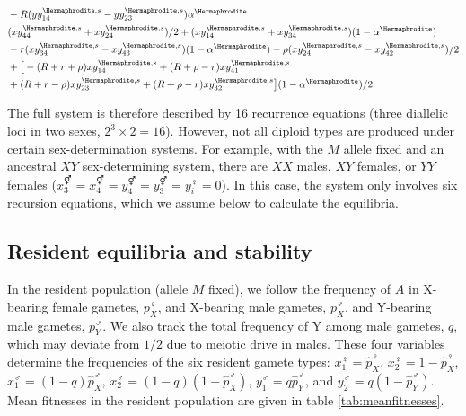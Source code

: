 \documentclass[12pt]{article}
\begin{document}
\begin{subequations}
\begin{align}
\begin{split}
&-R(yy_{14}^{\Hermaphrodite,s}-yy_{23}^{\Hermaphrodite,s}) \alpha^\Hermaphrodite\\
&(xy_{44}^{\Hermaphrodite,s}+xy_{24}^{\Hermaphrodite,s})/2+(xy_{14}^{\Hermaphrodite,s}+xy_{34}^{\Hermaphrodite,s})(1-\alpha^\Hermaphrodite)\\
&- r(xy_{34}^{\Hermaphrodite,s}-xy_{43}^{\Hermaphrodite,s})(1-\alpha^\Hermaphrodite) - \rho(xy_{24}^{\Hermaphrodite,s}-xy_{42}^{\Hermaphrodite,s})/2\\
&+\big{[}-(R+r+\rho) xy_{14}^{\Hermaphrodite,s} + (R+\rho-r)xy_{41}^{\Hermaphrodite,s}\\
&+(R+r-\rho) xy_{23}^{\Hermaphrodite,s} + (R+\rho-r) xy_{32}^{\Hermaphrodite,s}\big{]}(1-\alpha^\Hermaphrodite)/2
\end{split}
\end{align}
\label{eq:recursions}
\end{subequations}

\endgroup

\noindent
The full system is therefore described by 16 recurrence equations (three diallelic loci in two sexes, $2^3 \times 2 = 16$). 
However, not all diploid types are produced under certain sex-determination systems. 
For example, with the $M$ allele fixed and an ancestral $XY$ sex-determining system, there are $XX$ males, $XY$ females, or $YY$ females ($x_{3}^\Hermaphrodite=x_{4}^\Hermaphrodite=y_{4}^\Hermaphrodite=y_{3}^\Hermaphrodite=y_{i}^\female=0$). 
In this case, the system only involves six recursion equations, %
which we assume below to calculate the equilibria. 


\subsection*{Resident equilibria and stability}

In the resident population (allele $M$ fixed), we follow the frequency of $A$ in X-bearing female gametes, $p^\female_X$, and X-bearing male gametes, $p^\male_X$, and Y-bearing male gametes, $p^\male_Y$.
We also track the total frequency of Y among male gametes, $q$, which may deviate from $1/2$ due to meiotic drive in males. 
These four variables determine the frequencies of the six resident gamete types: $x_{1}^{\female}=\hat{p}_X^\female$, $x_{2}^{\female}=1-\hat{p}_X^\female$, $x_{1}^{\male}=(1-q)\hat{p}_X^\male$, $x_{2}^{\male}=(1-q)(1-\hat{p}_X^\male)$, $y_{1}^{\male}=q \hat{p}_Y^\male$, and $y_{2}^{\male}=q(1-\hat{p}_Y^\male)$. 
Mean fitnesses in the resident population are given in table \ref{tab:meanfitnesses}.
\end{document}

